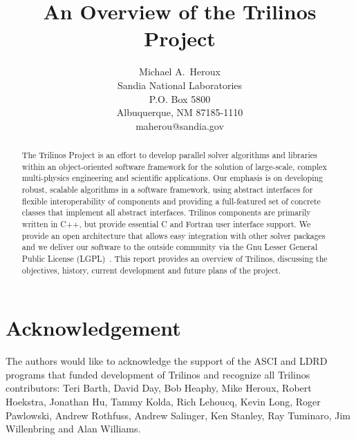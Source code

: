 \documentclass[12pt,relax]{SANDreport}
\title{An Overview of the Trilinos Project}
\author{Michael A.~Heroux\\
	  Sandia National Laboratories\\
	  P.O. Box 5800\\
	  Albuquerque, NM 87185-1110 \\
	  maherou@sandia.gov \\
	 }
\date{}
\begin{document}
    \maketitle

    \begin{abstract}
The Trilinos Project is an effort to develop parallel solver algorithms and libraries 
within 
an object-oriented software framework for the solution of large-scale, complex
multi-physics engineering and scientific applications.   Our emphasis is on 
developing robust, scalable algorithms in a software framework, using abstract 
interfaces for flexible interoperability of components and providing a 
full-featured set of concrete classes that implement all abstract interfaces. 
Trilinos components are primarily written in C++, but provide essential C and 
Fortran user interface support.  We provide an open architecture that allows 
easy integration with other solver packages and we deliver our software to 
the outside community via the Gnu Lesser General Public License
(LGPL)~\cite{gnu-license-site}.
This report provides an overview of Trilinos, discussing the objectives, history,
current development and future plans of the project.
    \end{abstract}


    \clearpage
    \section*{Acknowledgement}
The authors would like to acknowledge the support of the ASCI and LDRD programs
that funded development of Trilinos and recognize all Trilinos contributors: 
Teri Barth, David Day, Bob Heaphy, Mike Heroux, Robert Hoekstra, Jonathan Hu, 
Tammy Kolda, Rich Lehoucq,
Kevin Long, Roger Pawlowski, Andrew Rothfuss, Andrew Salinger, Ken Stanley, Ray Tuminaro,
Jim Willenbring and Alan Williams.
\end{document}
